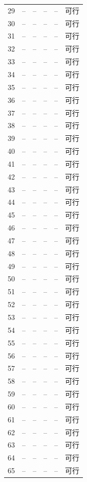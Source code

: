 \begin{longtable}{cccccc}
29 & -- & -- & -- & -- & 可行\\
30 & -- & -- & -- & -- & 可行\\
31 & -- & -- & -- & -- & 可行\\
32 & -- & -- & -- & -- & 可行\\
33 & -- & -- & -- & -- & 可行\\
34 & -- & -- & -- & -- & 可行\\
35 & -- & -- & -- & -- & 可行\\
36 & -- & -- & -- & -- & 可行\\
37 & -- & -- & -- & -- & 可行\\
38 & -- & -- & -- & -- & 可行\\
39 & -- & -- & -- & -- & 可行\\
40 & -- & -- & -- & -- & 可行\\
41 & -- & -- & -- & -- & 可行\\
42 & -- & -- & -- & -- & 可行\\
43 & -- & -- & -- & -- & 可行\\
44 & -- & -- & -- & -- & 可行\\
45 & -- & -- & -- & -- & 可行\\
46 & -- & -- & -- & -- & 可行\\
47 & -- & -- & -- & -- & 可行\\
48 & -- & -- & -- & -- & 可行\\
49 & -- & -- & -- & -- & 可行\\
50 & -- & -- & -- & -- & 可行\\
51 & -- & -- & -- & -- & 可行\\
52 & -- & -- & -- & -- & 可行\\
53 & -- & -- & -- & -- & 可行\\
54 & -- & -- & -- & -- & 可行\\
55 & -- & -- & -- & -- & 可行\\
56 & -- & -- & -- & -- & 可行\\
57 & -- & -- & -- & -- & 可行\\
58 & -- & -- & -- & -- & 可行\\
59 & -- & -- & -- & -- & 可行\\
60 & -- & -- & -- & -- & 可行\\
61 & -- & -- & -- & -- & 可行\\
62 & -- & -- & -- & -- & 可行\\
63 & -- & -- & -- & -- & 可行\\
64 & -- & -- & -- & -- & 可行\\
65 & -- & -- & -- & -- & 可行\\

\end{longtable}
